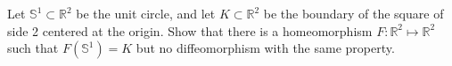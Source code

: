 Let $\mathbb{S}^1 \subset \mathbb{R}^2$ be the unit circle, and let $K \subset \mathbb{R}^2$ be the boundary of the square of side 2 centered at the origin.  Show that there is a homeomorphism $F: \mathbb{R}^2 \mapsto \mathbb{R}^2$ such that $F(\mathbb{S}^1) = K$ but no diffeomorphism with the same property.